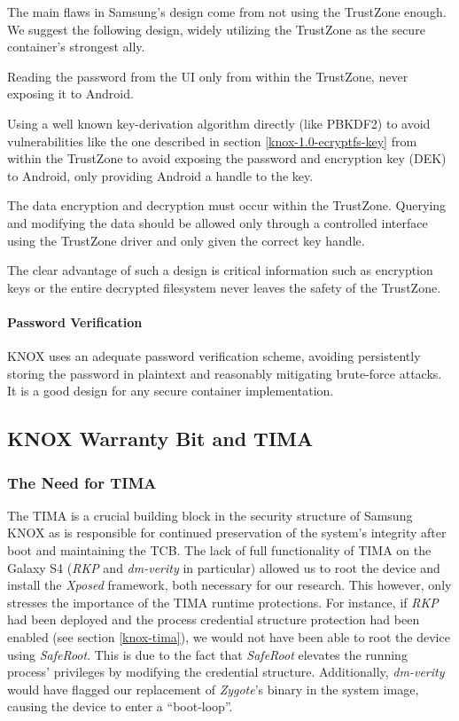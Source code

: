 \documentclass[11pt]{article}
\begin{document}
The main flaws in Samsung's design come from not using the TrustZone enough. We suggest the following design, widely utilizing the TrustZone 
as the secure container's strongest ally.
\begin{description}[labelindent=1cm]
\item[Password Input] Reading the password from the UI only from within the TrustZone, never exposing it to Android.
\item[Key Derivation] Using a well known key-derivation algorithm directly (like PBKDF2) to avoid vulnerabilities like the one described in section \ref{knox-1.0-ecryptfs-key} 
from within the TrustZone to avoid exposing the password and encryption key (DEK) to Android, only providing Android a handle to the key.
\item[Data Access] The data encryption and decryption must occur within the TrustZone. Querying and modifying the data should be allowed only through a 
controlled interface using the TrustZone driver and only given the correct key handle.
\end{description}
The clear advantage of such a design is critical information such as encryption keys or the entire decrypted filesystem never leaves the safety of the
TrustZone.

\paragraph{Password Verification}
KNOX uses an adequate password verification scheme, avoiding persistently storing the password in plaintext and reasonably mitigating brute-force attacks.
It is a good design for any secure container implementation.

\subsection{KNOX Warranty Bit and TIMA} \label{knox-1.0-tima}
\subsubsection{The Need for TIMA}
The TIMA is a crucial building block in the security structure of Samsung KNOX as is responsible for continued preservation 
of the system's integrity after boot and maintaining the TCB.
The lack of full functionality of TIMA on the Galaxy S4 (\emph{RKP} and \emph{dm-verity} in particular) allowed us to root the device and 
install the \emph{Xposed} framework, both necessary for our research. This however, only stresses the importance of the TIMA runtime protections. 
For instance, if \emph{RKP} had been deployed and the process credential structure protection had been enabled 
(see section \ref{knox-tima}), we would not have been able to root the device using \emph{SafeRoot}. 
This is due to the fact that \emph{SafeRoot} elevates the running process' privileges by modifying the credential structure.
Additionally, \emph{dm-verity} would have flagged our replacement of \emph{Zygote}'s binary in the system image, causing the device to enter 
a ``boot-loop''.
\end{document}
